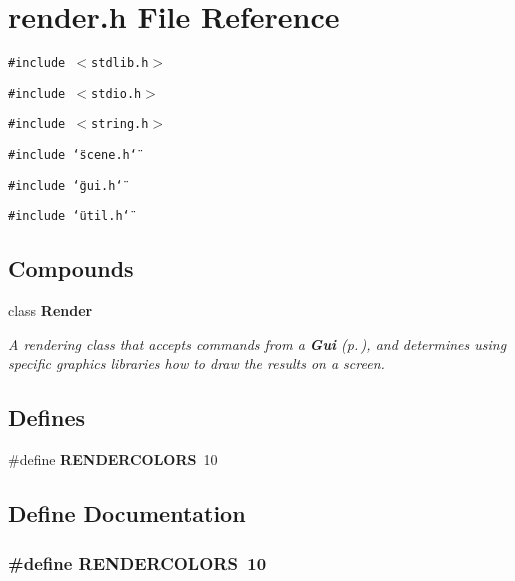 \section{render.h File Reference}
\label{render_h}
{\tt \#include $<$stdlib.h$>$}\par
{\tt \#include $<$stdio.h$>$}\par
{\tt \#include $<$string.h$>$}\par
{\tt \#include \char`\"{}scene.h\char`\"{}}\par
{\tt \#include \char`\"{}gui.h\char`\"{}}\par
{\tt \#include \char`\"{}util.h\char`\"{}}\par
\subsection*{Compounds}
\begin{CompactItemize}
\item 
class {\bf Render}
\begin{CompactList}\small\item\em A rendering class that accepts commands from a {\bf Gui} {\rm (p.\,\pageref{class_Gui})}, and determines using specific graphics libraries how to draw the results on a screen.\item\end{CompactList}\end{CompactItemize}
\subsection*{Defines}
\begin{CompactItemize}
\item 
\#define {\bf RENDERCOLORS}\ 10
\end{CompactItemize}


\subsection{Define Documentation}
\subsubsection{\setlength{\rightskip}{0pt plus 5cm}\#define RENDERCOLORS\ 10}\label{render_h_a0}



